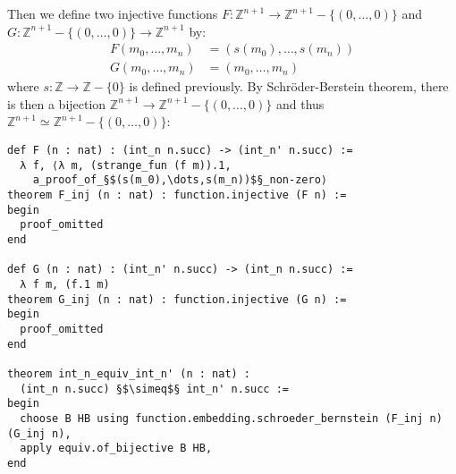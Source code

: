 \documentclass{report}
\theoremstyle{definition}
\theoremstyle{plain}
\newenvironment{code}{\captionsetup{type=listing}}{}
\begin{document}
Then we define two injective functions $F : \mathbb{Z}^{n+1}\to\mathbb{Z}^{n+1}-\{(0,\dots,0)\}$ and $G : \mathbb{Z}^{n+1}-\{(0,\dots,0)\}\to\mathbb{Z}^{n+1}$ by:
\begin{equation*}
\begin{aligned}
F (m_0,\dots,m_n) &= (s(m_0),\dots,s(m_n)) \\
G (m_0,\dots,m_n) &= (m_0,\dots,m_n)
\end{aligned}
\end{equation*}
where $s:\mathbb Z\to \mathbb Z-\{0\}$ is defined previously. By Schröder-Berstein theorem, there is then a bijection $\mathbb{Z}^{n+1}\to\mathbb{Z}^{n+1}-\{(0,\dots,0)\}$ and thus $\mathbb{Z}^{n+1}\simeq\mathbb{Z}^{n+1}-\{(0,\dots,0)\}$:
\begin{code}
\begin{verbatim}
def F (n : nat) : (int_n n.succ) -> (int_n' n.succ) := 
  λ f, ⟨λ m, (strange_fun (f m)).1,
    a_proof_of_§$(s(m_0),\dots,s(m_n))$§_non-zero⟩
theorem F_inj (n : nat) : function.injective (F n) :=
begin
  proof_omitted
end

def G (n : nat) : (int_n' n.succ) -> (int_n n.succ) := 
  λ f m, (f.1 m)
theorem G_inj (n : nat) : function.injective (G n) :=
begin
  proof_omitted
end

theorem int_n_equiv_int_n' (n : nat) : 
  (int_n n.succ) §$\simeq$§ int_n' n.succ :=
begin
  choose B HB using function.embedding.schroeder_bernstein (F_inj n) (G_inj n),
  apply equiv.of_bijective B HB,
end
\end{verbatim}
\caption{$\mathbb{Z}^{n+1}\simeq\mathbb{Z}^{n+1}-\{(0,\dots,0)\}$}
\end{code}
\end{document}
